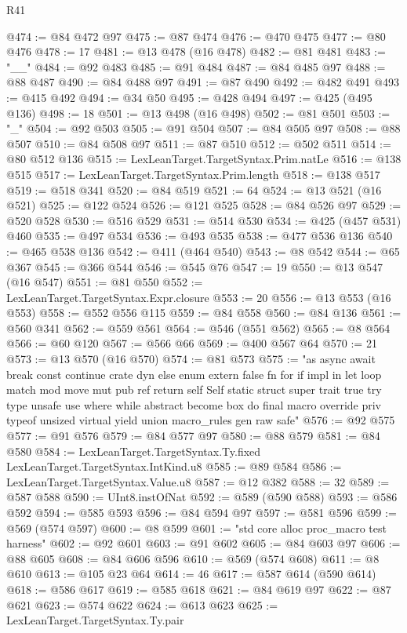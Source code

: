 \begin{lexlean}{R41}
\begin{coremodule}
@474 := @84 @472 @97
@475 := @87 @474
@476 := @470 @475
@477 := @80 @476
@478 := 17
@481 := @13 @478 (@16 @478)
@482 := @81 @481
@483 := "__"
@484 := @92 @483
@485 := @91 @484
@487 := @84 @485 @97
@488 := @88 @487
@490 := @84 @488 @97
@491 := @87 @490
@492 := @482 @491
@493 := @415 @492
@494 := @34 @50
@495 := @428 @494
@497 := @425 (@495 @136)
@498 := 18
@501 := @13 @498 (@16 @498)
@502 := @81 @501
@503 := "_"
@504 := @92 @503
@505 := @91 @504
@507 := @84 @505 @97
@508 := @88 @507
@510 := @84 @508 @97
@511 := @87 @510
@512 := @502 @511
@514 := @80 @512 @136
@515 := LexLeanTarget.TargetSyntax.Prim.natLe
@516 := @138 @515
@517 := LexLeanTarget.TargetSyntax.Prim.length
@518 := @138 @517
@519 := @518 @341
@520 := @84 @519
@521 := 64
@524 := @13 @521 (@16 @521)
@525 := @122 @524
@526 := @121 @525
@528 := @84 @526 @97
@529 := @520 @528
@530 := @516 @529
@531 := @514 @530
@534 := @425 (@457 @531) @460
@535 := @497 @534
@536 := @493 @535
@538 := @477 @536 @136
@540 := @465 @538 @136
@542 := @411 (@464 @540)
@543 := @8 @542
@544 := @65 @367
@545 := @366 @544
@546 := @545 @76
@547 := 19
@550 := @13 @547 (@16 @547)
@551 := @81 @550
@552 := LexLeanTarget.TargetSyntax.Expr.closure
@553 := 20
@556 := @13 @553 (@16 @553)
@558 := @552 @556 @115
@559 := @84 @558
@560 := @84 @136
@561 := @560 @341
@562 := @559 @561
@564 := @546 (@551 @562)
@565 := @8 @564
@566 := @60 @120
@567 := @566 @66
@569 := @400 @567 @64
@570 := 21
@573 := @13 @570 (@16 @570)
@574 := @81 @573
@575 := "as async await break const continue crate dyn else enum extern false fn for if impl in let loop match mod move mut pub ref return self Self static struct super trait true try type unsafe use where while abstract become box do final macro override priv typeof unsized virtual yield union macro_rules gen raw safe"
@576 := @92 @575
@577 := @91 @576
@579 := @84 @577 @97
@580 := @88 @579
@581 := @84 @580
@584 := LexLeanTarget.TargetSyntax.Ty.fixed LexLeanTarget.TargetSyntax.IntKind.u8
@585 := @89 @584
@586 := LexLeanTarget.TargetSyntax.Value.u8
@587 := @12 @382
@588 := 32
@589 := @587 @588
@590 := UInt8.instOfNat
@592 := @589 (@590 @588)
@593 := @586 @592
@594 := @585 @593
@596 := @84 @594 @97
@597 := @581 @596
@599 := @569 (@574 @597)
@600 := @8 @599
@601 := "std core alloc proc_macro test harness"
@602 := @92 @601
@603 := @91 @602
@605 := @84 @603 @97
@606 := @88 @605
@608 := @84 @606 @596
@610 := @569 (@574 @608)
@611 := @8 @610
@613 := @105 @23 @64
@614 := 46
@617 := @587 @614 (@590 @614)
@618 := @586 @617
@619 := @585 @618
@621 := @84 @619 @97
@622 := @87 @621
@623 := @574 @622
@624 := @613 @623
@625 := LexLeanTarget.TargetSyntax.Ty.pair

\end{coremodule}
\end{lexlean}
